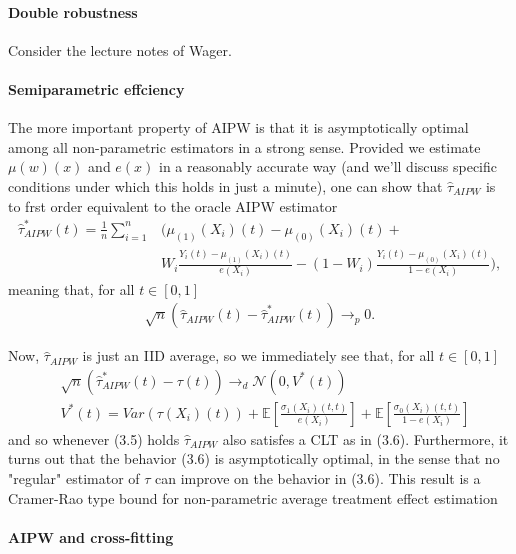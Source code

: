 \paragraph{Double robustness} Consider the lecture notes of Wager.

\paragraph{Semiparametric effciency}

The more important property of AIPW is that it is asymptotically optimal among all
non-parametric estimators in a strong sense. Provided we estimate $\mu(w)(x)$ and $e(x)$
in a reasonably accurate way (and we'll discuss specific conditions under which this
holds in just a minute), one can show that $\hat{\tau}_{AIPW}$ is to frst order
equivalent to the oracle AIPW estimator
\begin{align}
    \hat{\tau}_{AIPW}^\ast(t) = \frac{1}{n} \sum_{i=1}^n &(
    \mu_{(1)}(X_i)(t) - \mu_{(0)}(X_i)(t) +\\
    &W_i \frac{Y_i(t) - \mu_{(1)}(X_i)(t)}{e(X_i)} -
    (1 - W_i) \frac{Y_i(t) - \mu_{(0)}(X_i)(t)}{1 - e(X_i)}
    ),
\end{align}
meaning that, for all $t \in [0, 1]$
\begin{align}
    \sqrt{n} (\hat{\tau}_{AIPW}(t) - \hat{\tau}_{AIPW}^\ast(t)) \to_p 0.
\end{align}

Now, $\hat{\tau}_{AIPW}$ is just an IID average, so we immediately see that, for all $t
\in [0, 1]$
\begin{align}
    &\sqrt{n} (\hat{\tau}_{AIPW}^\ast(t) - \tau(t)) \to_d \mathcal{N}(0, V^\ast(t))\\
    &V^\ast(t) = Var(\tau(X_i)(t)) + \mathbb{E}[\frac{\sigma_1(X_i)(t, t)}{e(X_i)}] +
    \mathbb{E}[\frac{\sigma_0(X_i)(t, t)}{1 - e(X_i)}]
\end{align}
and so whenever (3.5) holds $\hat{\tau}_{AIPW}$ also satisfes a CLT as in (3.6).
Furthermore, it turns out that the behavior (3.6) is asymptotically optimal, in the
sense that no "regular" estimator of $\tau$ can improve on the behavior in (3.6). This
result is a Cramer-Rao type bound for non-parametric average treatment effect estimation

\paragraph{AIPW and cross-fitting}

